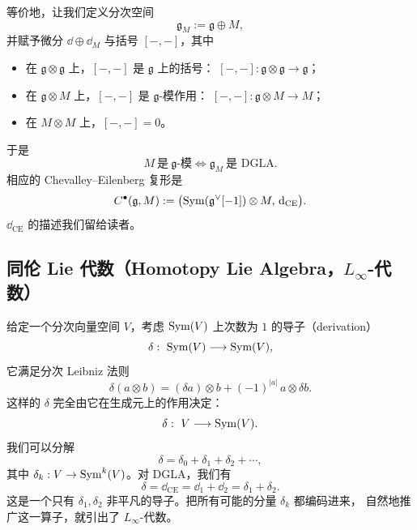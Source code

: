 等价地，让我们定义分次空间
\[
  \mathfrak g_M:=\mathfrak g\oplus M,
\]
并赋予微分 $\dd\oplus \dd_M$ 与括号 $[-,-]$，其中
\begin{itemize}[leftmargin=1.6em,itemsep=0.2em]
  \item 在 $\mathfrak g\otimes\mathfrak g$ 上，$[-,-]$ 是 $\mathfrak g$ 上的括号：
        $[-,-]:\mathfrak g\otimes\mathfrak g\to\mathfrak g$；
  \item 在 $\mathfrak g\otimes M$ 上，$[-,-]$ 是 $\mathfrak g$-模作用：
        $[-,-]:\mathfrak g\otimes M\to M$；
  \item 在 $M\otimes M$ 上，$[-,-]=0$。
\end{itemize}
于是
\[
  M\ \text{是}\ \mathfrak g\text{-模}\iff\mathfrak g_M\ \text{是 DGLA}.
\]
相应的 Chevalley--Eilenberg 复形是
\[
  C^{\bullet}(\mathfrak g,M)
  :=\bigl(\operatorname{Sym}(\mathfrak g^{\vee}[-1])\otimes M,\,\mathrm{d}_{\mathrm{CE}}\bigr).
\]
$\dd_{\mathrm{CE}}$ 的描述我们留给读者。


\subsection{同伦 Lie 代数（Homotopy Lie Algebra，$L_\infty$-代数）}

给定一个分次向量空间 $V$，考虑 $\operatorname{Sym}(V)$ 上次数为 $1$ 的导子（derivation）
\[
  \delta:\ \Sym(V)\longrightarrow\Sym(V),
\]
它满足分次 Leibniz 法则
\[
  \delta(a\otimes b)=(\delta a)\otimes b+(-1)^{|a|}\,a\otimes\delta b.
\]
这样的 $\delta$ 完全由它在生成元上的作用决定：
\[
  \delta:\ V\longrightarrow\Sym(V).
\]
我们可以分解
\[
  \delta=\delta_0+\delta_1+\delta_2+\cdots,
\]
其中 $\delta_k:V\to\operatorname{Sym}^{k}(V)$。对 DGLA，我们有
\[
  \delta=\dd_{\mathrm{CE}}=\dd_1+\dd_2=\delta_1+\delta_2.
\]
这是一个只有 $\delta_1,\delta_2$ 非平凡的导子。把所有可能的分量 $\delta_k$ 都编码进来，
自然地推广这一算子，就引出了 $L_\infty$-代数。


